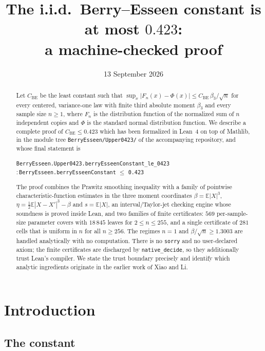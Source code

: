\documentclass[11pt,a4paper]{article}
\title{The i.i.d.\ Berry--Esseen constant is at most $0.423$:\\
a machine-checked proof}
\author{}
\date{13 September 2026}
\theoremstyle{definition}
\newcommand{\EE}{\mathbb{E}}
\newcommand{\Lean}[1]{\texttt{#1}}
\newcommand{\file}[1]{\texttt{#1}}
\begin{document}
\maketitle

\begin{abstract}
Let $C_{\mathrm{BE}}$ be the least constant such that
$\sup_x|F_n(x)-\Phi(x)|\le C_{\mathrm{BE}}\,\beta_3/\sqrt n$ for every centered,
variance-one law with finite third absolute moment $\beta_3$ and every sample
size $n\ge 1$, where $F_n$ is the distribution function of the normalized sum of
$n$ independent copies and $\Phi$ is the standard normal distribution function.
We describe a complete proof of $C_{\mathrm{BE}}\le 0.423$ which has been
formalized in Lean~4 on top of Mathlib, in the module tree
\file{BerryEsseen/Upper0423/} of the accompanying repository, and whose final
statement is
\begin{center}
  \small
  \Lean{BerryEsseen.Upper0423.berryEsseenConstant\_le\_0423}\\[2pt]
  ${}:{}$\Lean{BerryEsseen.berryEsseenConstant} $\le$ \Lean{0.423}
\end{center}
The proof combines the Prawitz smoothing inequality with a family of pointwise
characteristic-function estimates in the three moment coordinates
$\beta=\EE|X|^3$, $\eta=\tfrac12\EE|X-X'|^3-\beta$ and $s=\EE|X|$, an
interval/Taylor-jet checking engine whose soundness is proved inside Lean, and
two families of finite certificates: $569$ per-sample-size parameter covers with
$18\,845$ leaves for $2\le n\le 255$, and a single certificate of $281$ cells
that is uniform in $n$ for all $n\ge 256$. The regimes $n=1$ and
$\beta/\sqrt n\ge 1.3003$ are handled analytically with no computation. There is
no \Lean{sorry} and no user-declared axiom; the finite certificates are
discharged by \Lean{native\_decide}, so they additionally trust Lean's compiler.
We state the trust boundary precisely and identify which analytic ingredients
originate in the earlier work of Xiao and Li.
\end{abstract}

\tableofcontents

\bigskip

\section{Introduction}
\label{sec:intro}

\subsection{The constant}
\end{document}

